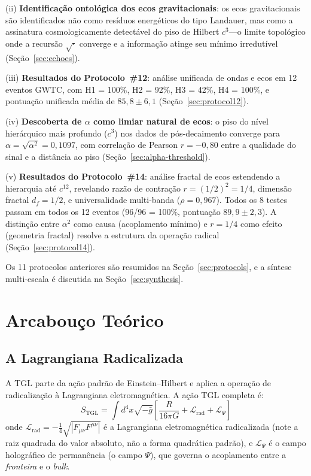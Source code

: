 \documentclass[12pt,a4paper,twocolumn]{article}
\newcommand{\alphaii}{\alpha^{2}}
\newcommand{\Psifield}{\Psi}
\newcommand{\boundary}{\textit{fronteira}}
\newcommand{\bulk}{\textit{bulk}}
\begin{document}
(ii) \textbf{Identificação ontológica dos ecos gravitacionais}: os ecos gravitacionais são identificados não como resíduos energéticos do tipo Landauer, mas como a assinatura cosmologicamente detectável do piso de Hilbert $c^3$---o limite topológico onde a recursão $\sqrt{\cdot}$ converge e a informação atinge seu mínimo irredutível (Seção~\ref{sec:echoes}).

(iii) \textbf{Resultados do Protocolo~\#12}: análise unificada de ondas e ecos em 12 eventos GWTC, com H1 = 100\%, H2 = 92\%, H3 = 42\%, H4 = 100\%, e pontuação unificada média de $85{,}8 \pm 6{,}1$ (Seção~\ref{sec:protocol12}).

(iv) \textbf{Descoberta de $\alpha$ como limiar natural de ecos}: o piso do nível hierárquico mais profundo ($c^3$) nos dados de pós-decaimento converge para $\alpha = \sqrt{\alphaii} = 0{,}1097$, com correlação de Pearson $r = -0{,}80$ entre a qualidade do sinal e a distância ao piso (Seção~\ref{sec:alpha-threshold}).

(v) \textbf{Resultados do Protocolo~\#14}: análise fractal de ecos estendendo a hierarquia até $c^{12}$, revelando razão de contração $r = (1/2)^2 = 1/4$, dimensão fractal $d_f = 1/2$, e universalidade multi-banda ($\rho = 0{,}967$). Todos os 8 testes passam em todos os 12 eventos (96/96 = 100\%, pontuação $89{,}9 \pm 2{,}3$). A distinção entre $\alphaii$ como causa (acoplamento mínimo) e $r = 1/4$ como efeito (geometria fractal) resolve a estrutura da operação radical (Seção~\ref{sec:protocol14}).

Os 11 protocolos anteriores são resumidos na Seção~\ref{sec:protocols}, e a síntese multi-escala é discutida na Seção~\ref{sec:synthesis}.


\section{Arcabouço Teórico}
\label{sec:framework}

\subsection{A Lagrangiana Radicalizada}

A TGL parte da ação padrão de Einstein--Hilbert e aplica a operação de radicalização à Lagrangiana eletromagnética. A ação TGL completa é:
\begin{equation}
\label{eq:action}
S_{\text{TGL}} = \int d^4x \sqrt{-\bar{g}} \left[ \frac{R}{16\pi G} + \mathcal{L}_{\text{rad}} + \mathcal{L}_\Psifield \right]
\end{equation}
onde $\mathcal{L}_{\text{rad}} = -\frac{1}{4}\sqrt{|F_{\mu\nu}F^{\mu\nu}|}$ é a Lagrangiana eletromagnética radicalizada (note a raiz quadrada do valor absoluto, não a forma quadrática padrão), e $\mathcal{L}_\Psifield$ é o campo holográfico de permanência (o campo $\Psifield$), que governa o acoplamento entre a \boundary{} e o \bulk.
\end{document}
